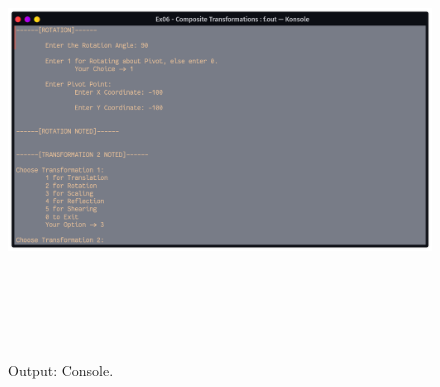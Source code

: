 \documentclass[12pt, a4]{article}
\begin{document}
\newpage
\subsection*{}
\begin{figure}[h]
\centering
\caption{Output: Console.}
\includegraphics[height=12cm, width=17cm]{Outputs/Console-3.png}
\end{figure}

\newpage
\end{document}
